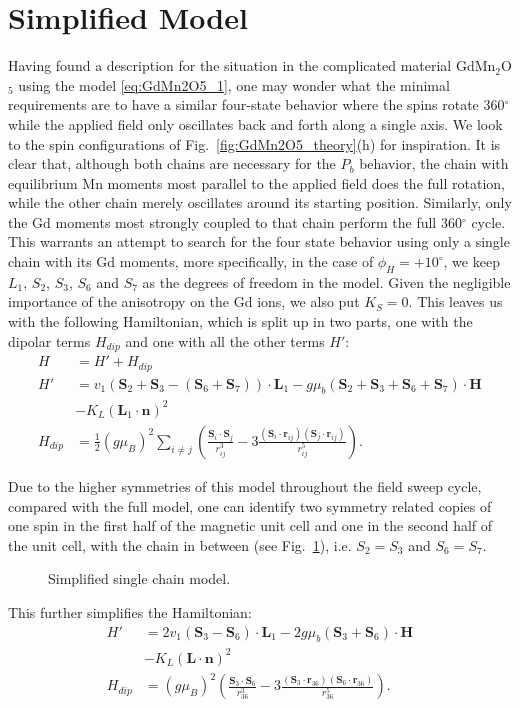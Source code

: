 \section{Simplified Model}
Having found a description for the situation in the complicated material GdMn$_2$O$_5$ using the model \ref{eq:GdMn2O5_1}, one may wonder what the minimal requirements are to have a similar four-state behavior where the spins rotate 360$^\circ$ while the applied field only oscillates back and forth along a single axis.
We look to the spin configurations of Fig.~\ref{fig:GdMn2O5_theory}(h) for inspiration.
It is clear that, although both chains are necessary for the $P_b$ behavior, the chain with equilibrium Mn moments most parallel to the applied field does the full rotation, while the other chain merely oscillates around its starting position.
Similarly, only the Gd moments most strongly coupled to that chain perform the full 360$^\circ$ cycle.
This warrants an attempt to search for the four state behavior using only a single chain with its Gd moments, more specifically, in the case of $\phi_H = +10^\circ$, we keep $L_1$, $S_2$, $S_3$, $S_6$ and $S_7$ as the degrees of freedom in the model.
Given the negligible importance of the anisotropy on the Gd ions, we also put $K_S = 0$.
This leaves us with the following Hamiltonian, which is split up in two parts, one with the dipolar terms $H_{dip}$ and one with all the other terms $H'$:
\begin{align}
	H &= H' + H_{dip} \\
	H' &= v_1(\mathbf{S}_2 + \mathbf{S}_3 - (\mathbf{S}_6 + \mathbf{S}_7))\cdot\mathbf{L}_1 - g \mu_b (\mathbf{S}_2 + \mathbf{S}_3 + \mathbf{S}_6 + \mathbf{S}_7) \cdot \mathbf{H} \\
	&- K_L (\mathbf{L}_1 \cdot \mathbf{n})^2 \\
	H_{dip} &= \frac{1}{2}(g \mu_B)^2\sum_{i\neq j}\left(\frac{\mathbf{S}_i\cdot \mathbf{S}_j}{r_{ij}^3}-3\frac{(\mathbf{S}_i\cdot \mathbf{r}_{ij})(\mathbf{S}_j\cdot \mathbf{r}_{ij})}{r_{ij}^5}\right).
\end{align}

Due to the higher symmetries of this model throughout the field sweep cycle, compared with the full model, one can identify two symmetry related copies of one spin in the first half of the magnetic unit cell and one in the second half of the unit cell, with the chain in between (see Fig.~\ref{fig:GdMn2O5_simple_model}), i.e. $S_2 = S_3$ and $S_6 = S_7$.
\begin{figure}
	\caption{\label{fig:GdMn2O5_simple_model} Simplified single chain model.}
\end{figure}
This further simplifies the Hamiltonian:
\begin{align}
	H' &= 2v_1(\mathbf{S}_3 - \mathbf{S}_6)\cdot\mathbf{L}_1 - 2g \mu_b (\mathbf{S}_3 + \mathbf{S}_6) \cdot \mathbf{H} \\
	&- K_L (\mathbf{L} \cdot \mathbf{n})^2 \\
	H_{dip} &= (g \mu_B)^2\left(\frac{\mathbf{S}_3\cdot \mathbf{S}_6}{r_{36}^3}-3\frac{(\mathbf{S}_3\cdot \mathbf{r}_{36})(\mathbf{S}_6\cdot \mathbf{r}_{36})}{r_{36}^5}\right).
\end{align}
\printbibliography
